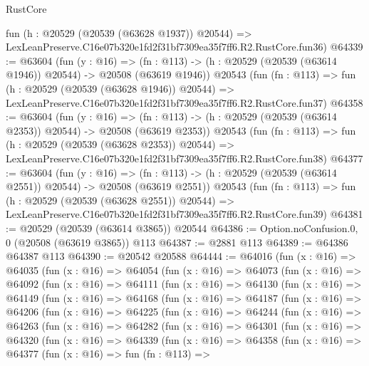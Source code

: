 \begin{lexlean}{RustCore}
\begin{coremodule}
    fun (h : @20529 (@20539 (@63628 @1937)) @20544) =>
    LexLeanPreserve.C16e07b320e1fd2f31bf7309ea35f7ff6.R2.RustCore.fun36)
@64339 := @63604
    (fun (y : @16) =>
    (fn : @113) -> (h : @20529 (@20539 (@63614 @1946)) @20544) -> @20508 (@63619 @1946))
    @20543
    (fun (fn : @113) =>
    fun (h : @20529 (@20539 (@63628 @1946)) @20544) =>
    LexLeanPreserve.C16e07b320e1fd2f31bf7309ea35f7ff6.R2.RustCore.fun37)
@64358 := @63604
    (fun (y : @16) =>
    (fn : @113) -> (h : @20529 (@20539 (@63614 @2353)) @20544) -> @20508 (@63619 @2353))
    @20543
    (fun (fn : @113) =>
    fun (h : @20529 (@20539 (@63628 @2353)) @20544) =>
    LexLeanPreserve.C16e07b320e1fd2f31bf7309ea35f7ff6.R2.RustCore.fun38)
@64377 := @63604
    (fun (y : @16) =>
    (fn : @113) -> (h : @20529 (@20539 (@63614 @2551)) @20544) -> @20508 (@63619 @2551))
    @20543
    (fun (fn : @113) =>
    fun (h : @20529 (@20539 (@63628 @2551)) @20544) =>
    LexLeanPreserve.C16e07b320e1fd2f31bf7309ea35f7ff6.R2.RustCore.fun39)
@64381 := @20529 (@20539 (@63614 @3865)) @20544
@64386 := Option.noConfusion.{0, 0} (@20508 (@63619 @3865)) @113
@64387 := @2881 @113
@64389 := @64386 @64387 @113
@64390 := @20542 @20588
@64444 := @64016
    (fun (x : @16) =>
    @64035
      (fun (x : @16) =>
      @64054
        (fun (x : @16) =>
        @64073
          (fun (x : @16) =>
          @64092
            (fun (x : @16) =>
            @64111
              (fun (x : @16) =>
              @64130
                (fun (x : @16) =>
                @64149
                  (fun (x : @16) =>
                  @64168
                    (fun (x : @16) =>
                    @64187
                      (fun (x : @16) =>
                      @64206
                        (fun (x : @16) =>
                        @64225
                          (fun (x : @16) =>
                          @64244
                            (fun (x : @16) =>
                            @64263
                              (fun (x : @16) =>
                              @64282
                                (fun (x : @16) =>
                                @64301
                                  (fun (x : @16) =>
                                  @64320
                                    (fun (x : @16) =>
                                    @64339
                                      (fun (x : @16) =>
                                      @64358
                                        (fun (x : @16) =>
                                        @64377
                                          (fun (x : @16) =>
                                          fun (fn : @113) =>

\end{coremodule}
\end{lexlean}
